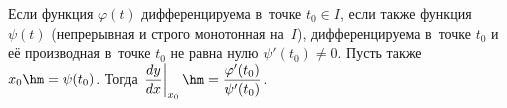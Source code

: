 \label{param}
    Если функция $\varphi(t)$ дифференцируема в~точке $t_0\in I$, если также функция $\psi(t)$ (непрерывная и строго монотонная на~$I$), дифференцируема в~точке $t_0$ и её производная в~точке $t_0$ не равна нулю $\psi'(t_0)\neq0$. Пусть также $x_0\hm=\psi(t_0)$. Тогда
    $\left.\dfrac{dy}{dx}\right|_{x_0}\hm=\dfrac{\varphi'(t_0)}{\psi'(t_0)}$.
